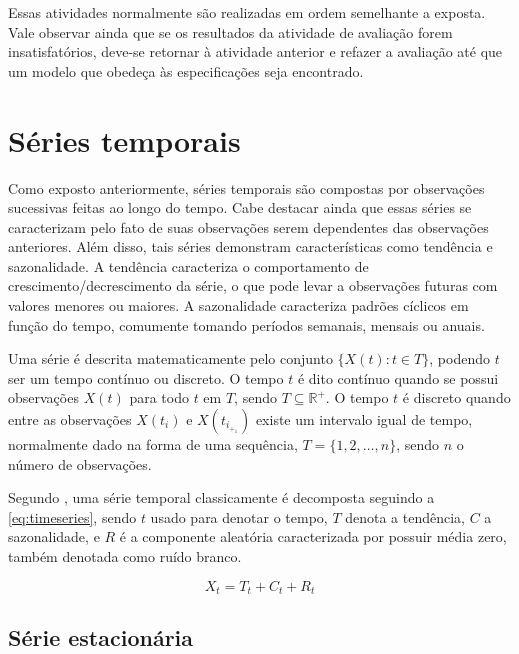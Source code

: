 \documentclass[
    12pt,
    oneside,
    a4paper,
    english,
    brazil
]{abntex2}
\begin{document}
Essas atividades normalmente são realizadas em ordem semelhante a exposta. Vale observar ainda que se os resultados da atividade de avaliação forem insatisfatórios, deve-se retornar à atividade anterior e refazer a avaliação até que
um modelo que obedeça às especificações seja encontrado.

\section{Séries temporais}

Como exposto anteriormente, séries temporais são compostas por observações sucessivas feitas ao longo do tempo. Cabe destacar ainda que essas séries se caracterizam pelo fato de suas observações serem dependentes das observações anteriores. Além disso, tais séries demonstram características como tendência e sazonalidade. A tendência caracteriza o comportamento de crescimento/decrescimento da série, o que pode levar a observações futuras com valores menores ou maiores. A sazonalidade caracteriza padrões cíclicos em função do tempo, comumente tomando períodos semanais, mensais ou anuais.

Uma série é descrita matematicamente pelo conjunto $\{X(t): t \in T\}$, podendo
$t$ ser um tempo contínuo ou discreto. O tempo $t$ é dito contínuo quando se possui observações $X(t)$ para todo $t$ em $T$, sendo $T \subseteq
\mathbb{R}^{+}$. O tempo $t$ é discreto quando entre as observações $X(t_i)$ e $X(t_i_+_1)$ existe um intervalo igual de tempo, normalmente dado na forma de uma sequência, $T = \{1,
2, \ldots, n\}$, sendo $n$ o número de observações.

Segundo , uma série temporal classicamente é decomposta
seguindo a \autoref{eq:timeseries}, sendo $t$ usado para denotar o tempo, $T$
denota a tendência, $C$ a sazonalidade, e $R$ é a componente aleatória caracterizada por possuir média zero, também denotada como ruído branco.

\begin{equation}
    \label{eq:timeseries}
    X_t = T_t + C_t + R_t
\end{equation}

\subsection{Série estacionária}
\end{document}
